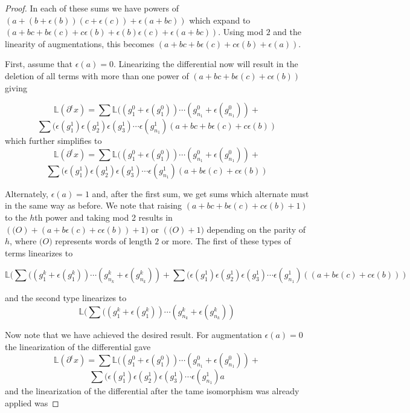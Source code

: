 \documentclass[11pt,oneside]{amsart}
\begin{document}
\begin{proof}
In each of these sums we have powers of $(a +(b + \epsilon(b))(c + \epsilon(c)) + \epsilon(a+bc))$ which expand to $(a + bc + b\epsilon(c) + c \epsilon(b) + \epsilon(b)\epsilon(c) + \epsilon(a + bc))$. Using mod $2$ and the linearity of augmentations, this becomes $(a + bc + b\epsilon(c) + c \epsilon(b) +  \epsilon(a))$.


First, assume that $\epsilon(a) = 0$. Linearizing the differential now will result in the deletion of all terms with more than one power of $(a + bc + b\epsilon(c) + c \epsilon(b) )$ giving 

\[\mathbb{L}(\partial^{\epsilon} x)  = \sum \mathbb{L}((g_1^{0} + \epsilon(g_1^{0})) \cdots (g_{n_1}^{0} + \epsilon(g_{n_1}^{0})) +    \]
\[\sum (\epsilon(g_1^{1})\epsilon(g_2^{1})\epsilon(g_3^{1}) \cdots \epsilon(g_{n_1}^{1})(a + bc + b\epsilon(c) + c \epsilon(b)) \]
which further simplifies to 
\[\mathbb{L}(\partial^{\epsilon} x)  = \sum \mathbb{L}((g_1^{0} + \epsilon(g_1^{0})) \cdots (g_{n_1}^{0} + \epsilon(g_{n_1}^{0})) +    \]
\[\sum (\epsilon(g_1^{1})\epsilon(g_2^{1})\epsilon(g_3^{1}) \cdots \epsilon(g_{n_1}^{1})(a + b\epsilon(c) + c \epsilon(b)) \]

Alternately, $\epsilon(a) = 1$ and, after the first sum, we get sums which alternate must in the same way as before. We note that raising $(a + bc + b\epsilon(c) + c \epsilon(b) +  1)$ to the $h$th power and taking mod 2 results in $( \mathbb(O) + (a  + b\epsilon(c) + c \epsilon(b)) +  1)$  or $( \mathbb(O) +  1)$ depending on the parity of $h$, where $\mathbb(O)$ represents words of length $2$ or more. The first of these types of terms linearizes to 

\[ \mathbb{L}(\sum ((g_1^{k} + \epsilon(g_1^{k})) \cdots (g_{n_k}^{k} + \epsilon(g_{n_k}^{k})) + \sum (\epsilon(g_1^{1})\epsilon(g_2^{1})\epsilon(g_3^{1}) \cdots \epsilon(g_{n_1}^{1})(  (a  + b\epsilon(c) + c \epsilon(b)))\]

and the second type linearizes to 
\[ \mathbb{L}(\sum ((g_1^{k} + \epsilon(g_1^{k})) \cdots (g_{n_k}^{k} + \epsilon(g_{n_k}^{k})) \]



Now note that we have achieved the desired result. For augmentation $\epsilon(a) = 0$ the linearization of the differential gave 
\[\mathbb{L}(\partial^{\epsilon} x)  = \sum \mathbb{L}((g_1^{0} + \epsilon(g_1^{0})) \cdots (g_{n_1}^{0} + \epsilon(g_{n_1}^{0})) +    \]
\[\sum (\epsilon(g_1^{1})\epsilon(g_2^{1})\epsilon(g_3^{1}) \cdots \epsilon(g_{n_1}^{1})a \]
and the linearization of the differential after the tame isomorphism was already applied was 



\end{proof}
\end{document}
